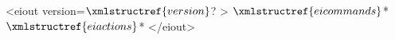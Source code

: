 <eiout version=$\xmlstructref{version}$? >
  $\xmlstructref{eicommands}$*
  $\xmlstructref{eiactions}$*
</eiout>
